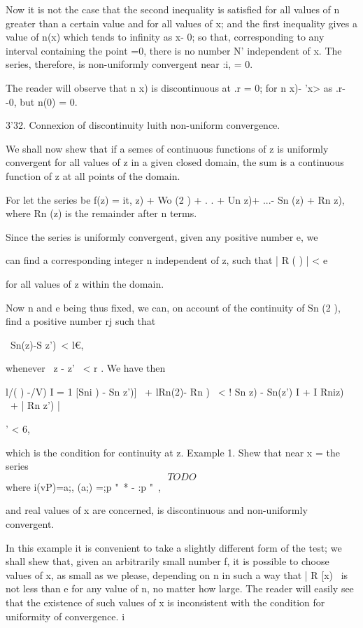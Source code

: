 %
%

Now it is not the case that the second inequality is satisfied for all
values of n greater than a certain value and for all values of x; and
the first inequality gives a value of n(x) which tends to infinity as
x- 0; so that, corresponding to any interval containing the point =0,
there is no number N' independent of x. The series, therefore, is
non-uniformly convergent near :i, = 0.

The reader will observe that n x) is discontinuous at .r = 0; for n
x)- 'x> as .r- -0, but n(0) = 0.

3'32. Connexion of discontinuity luith non-uniform convergence.

We shall now shew that if a semes of continuous functions of z is
uniformly convergent for all values of z in a given closed domain, the
sum is a continuous function of z at all points of the domain.

For let the series be f(z) = it, z) + Wo (2 ) +  . . + Un z)+ ...- Sn
(z) + Rn z), where Rn (z) is the remainder after n terms.

Since the series is uniformly convergent, given any positive number e,
we

can find a corresponding integer n independent of z, such that | R ( )
| < e

for all values of z within the domain.

Now n and e being thus fixed, we can, on account of the continuity of
Sn (2 ), find a positive number rj such that

\ Sn(z)-S z')\ < l€,

whenever \ z - z' \ < r . We have then

l/( ) -/V) I = 1 [Sni ) - Sn z')] \ + lRn(2)- Rn ) \ < ! Sn z) -
Sn(z') I + I Rniz) \ + | Rn z') |

' < 6,

which is the condition for continuity at z. Example 1. Shew that near
x = the series
$$
TODO
$$
where i(vP)=a;, (a;) =;p "~* - :p "~,

and real values of x are concerned, is discontinuous and non-uniformly
convergent.

In this example it is convenient to take a slightly different form of
the test; we shall shew that, given an arbitrarily small number f, it
is possible to choose values of x, as small as we please, depending on
n in such a way that | R [x) \ is not less than e for any value of n,
no matter how large. The reader will easily see that the existence of
such values of x is inconsistent with the condition for uniformity of
convergence. i\

